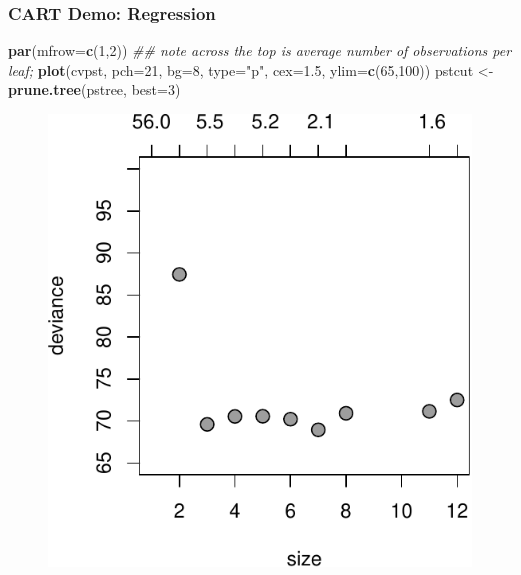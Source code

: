 \documentclass[
  shownotes,
  xcolor={svgnames},
  hyperref={colorlinks,citecolor=DarkBlue,linkcolor=DarkRed,urlcolor=DarkBlue}
  ]{beamer}
\newenvironment{Shaded}{\begin{snugshade}}{\end{snugshade}}
\newcommand{\CommentTok}[1]{\textcolor[rgb]{0.56,0.35,0.01}{\textit{#1}}}
\newcommand{\DataTypeTok}[1]{\textcolor[rgb]{0.13,0.29,0.53}{#1}}
\newcommand{\DecValTok}[1]{\textcolor[rgb]{0.00,0.00,0.81}{#1}}
\newcommand{\FloatTok}[1]{\textcolor[rgb]{0.00,0.00,0.81}{#1}}
\newcommand{\KeywordTok}[1]{\textcolor[rgb]{0.13,0.29,0.53}{\textbf{#1}}}
\newcommand{\NormalTok}[1]{#1}
\newcommand{\StringTok}[1]{\textcolor[rgb]{0.31,0.60,0.02}{#1}}
\begin{document}
\begin{frame}[fragile]
\frametitle{CART Demo: Regression}

\begin{scriptsize}
\begin{Shaded}
\begin{Highlighting}[]
\KeywordTok{par}\NormalTok{(}\DataTypeTok{mfrow=}\KeywordTok{c}\NormalTok{(}\DecValTok{1}\NormalTok{,}\DecValTok{2}\NormalTok{))}
\CommentTok{\#\# note across the top is \textquotesingle{}average number of observations per leaf\textquotesingle{}; }
\KeywordTok{plot}\NormalTok{(cvpst, }\DataTypeTok{pch=}\DecValTok{21}\NormalTok{, }\DataTypeTok{bg=}\DecValTok{8}\NormalTok{, }\DataTypeTok{type=}\StringTok{"p"}\NormalTok{, }\DataTypeTok{cex=}\FloatTok{1.5}\NormalTok{, }\DataTypeTok{ylim=}\KeywordTok{c}\NormalTok{(}\DecValTok{65}\NormalTok{,}\DecValTok{100}\NormalTok{))}
\NormalTok{pstcut \textless{}{-}}\StringTok{ }\KeywordTok{prune.tree}\NormalTok{(pstree, }\DataTypeTok{best=}\DecValTok{3}\NormalTok{)}
\end{Highlighting}
\end{Shaded}
\end{scriptsize}

\begin{figure}[H] \centering
            \captionsetup{justification=centering}
              \includegraphics[scale=0.55]{figures/unnamed-chunk-5-1.pdf}
 \end{figure}


\end{frame}
\end{document}
